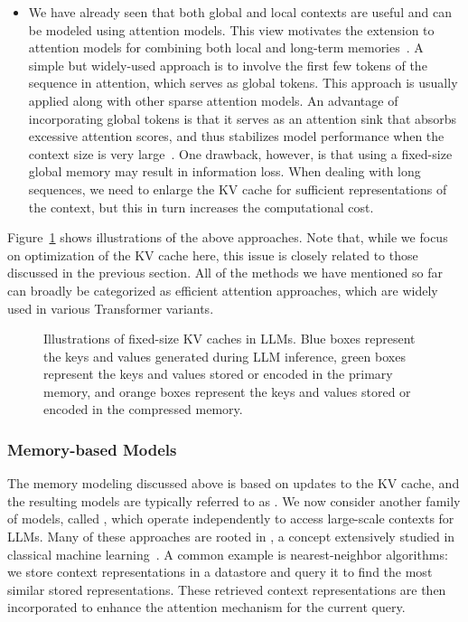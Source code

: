 \begin{itemize}
\item \vspace{0.3em} We have already seen that both global and local contexts are useful and can be modeled using attention models. This view motivates the extension to attention models for combining both local and long-term memories~\cite{ainslie-etal:2020etc,zaheer-etal:2020big,gupta-berant:2020gmat}. A simple but widely-used approach is to involve the first few tokens of the sequence in attention, which serves as global tokens. This approach is usually applied along with other sparse attention models. An advantage of incorporating global tokens is that it serves as an attention sink that absorbs excessive attention scores, and thus stabilizes model performance when the context size is very large~\cite{xiao-etal:2024efficient}. One drawback, however, is that using a fixed-size global memory may result in information loss. When dealing with long sequences, we need to enlarge the KV cache for sufficient representations of the context, but this in turn increases the computational cost.

\end{itemize}
\vspace{0.5em}

Figure~\ref{fig:comparison-kv-cache-optimizations} shows illustrations of the above approaches. Note that, while we focus on optimization of the KV cache here, this issue is closely related to those discussed in the previous section. All of the methods we have mentioned so far can broadly be categorized as efficient attention approaches, which are widely used in various Transformer variants.

\begin{figure}[!t]
\centering

\caption{Illustrations of fixed-size KV caches in LLMs. Blue boxes represent the keys and values generated during LLM inference, green boxes represent the keys and values stored or encoded in the primary memory, and orange boxes represent the keys and values stored or encoded in the compressed memory.}
\label{fig:comparison-kv-cache-optimizations}
\end{figure}

\subsubsection{Memory-based Models}

\noindent The memory modeling discussed above is based on updates to the KV cache, and the resulting models are typically referred to as . We now consider another family of models, called , which operate independently to access large-scale contexts for LLMs. Many of these approaches are rooted in , a concept extensively studied in classical machine learning~\cite{Bishop:2006}. A common example is nearest-neighbor algorithms: we store context representations in a datastore and query it to find the most similar stored representations. These retrieved context representations are then incorporated to enhance the attention mechanism for the current query.

